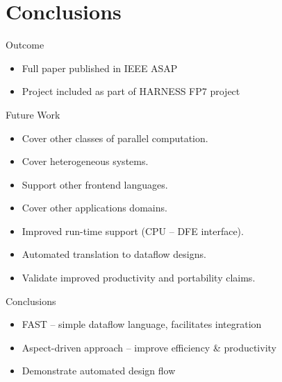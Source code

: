 \section{Conclusions}
\begin{frame}{Outcome}
\begin{itemize}
  \item Full paper published in IEEE ASAP
  \item Project included as part of HARNESS FP7 project
\end{itemize}
\end{frame}

\begin{frame}{Future Work}

\begin{itemize}
\item Cover other classes of parallel computation.

\item Cover heterogeneous systems.

\item Support other frontend languages.

\item Cover other applications domains.

\item Improved run-time support (CPU -- DFE interface).

\item Automated translation to dataflow designs.

\item Validate improved productivity and
    portability claims.

\end{itemize}
\end{frame}

\begin{frame}{Conclusions}
\begin{itemize}
  \item FAST -- simple dataflow language, facilitates integration
  \item Aspect-driven approach -- improve efficiency \& productivity
  \item Demonstrate automated design flow
\end{itemize}
\end{frame}

